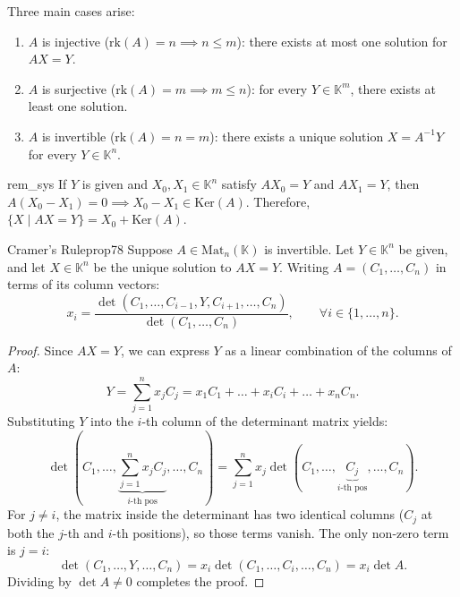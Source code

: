 \documentclass[11pt, a4paper]{article}
\newcommand{\K}{\mathbb{K}}
\begin{document}
Three main cases arise:
\begin{enumerate}
  \item $A$ is injective ($\text{rk}(A) = n \implies n \le m$): there exists at most one solution for $AX = Y$.
  \item $A$ is surjective ($\text{rk}(A) = m \implies m \le n$): for every $Y \in \K^m$, there exists at least one solution.
  \item $A$ is invertible ($\text{rk}(A) = n = m$): there exists a unique solution $X = A^{-1}Y$ for every $Y \in \K^n$.
\end{enumerate}

\begin{remark}{}{rem_sys}
  If $Y$ is given and $X_0, X_1 \in \K^n$ satisfy $A X_0 = Y$ and $A X_1 = Y$, then $A(X_0 - X_1) = 0 \implies X_0 - X_1 \in \text{Ker}(A)$.
  Therefore, $\{X \mid AX = Y\} = X_0 + \text{Ker}(A)$.
\end{remark}

\begin{proposition}{Cramer's Rule}{prop78}
  Suppose $A \in \text{Mat}_n(\K)$ is invertible. Let $Y \in \K^n$ be given, and let $X \in \K^n$ be the unique solution to $AX = Y$.
  Writing $A = (C_1, \dots, C_n)$ in terms of its column vectors:
  \[
    x_i = \frac{\det(C_1, \dots, C_{i-1}, Y, C_{i+1}, \dots, C_n)}{\det(C_1, \dots, C_n)}, \qquad \forall i \in \{1, \dots, n\}.
  \]
\end{proposition}

\begin{proof}
  Since $AX = Y$, we can express $Y$ as a linear combination of the columns of $A$:
  \[
    Y = \sum_{j=1}^n x_j C_j = x_1 C_1 + \dots + x_i C_i + \dots + x_n C_n.
  \]
  Substituting $Y$ into the $i$-th column of the determinant matrix yields:
  \[
    \det(C_1, \dots, \underbrace{\sum_{j=1}^n x_j C_j}_{i\text{-th pos}}, \dots, C_n) = \sum_{j=1}^n x_j \det(C_1, \dots, \underbrace{C_j}_{i\text{-th pos}}, \dots, C_n).
  \]
  For $j \neq i$, the matrix inside the determinant has two identical columns ($C_j$ at both the $j$-th and $i$-th positions), so those terms vanish. The only non-zero term is $j = i$:
  \[
    \det(C_1, \dots, Y, \dots, C_n) = x_i \det(C_1, \dots, C_i, \dots, C_n) = x_i \det A.
  \]
  Dividing by $\det A \neq 0$ completes the proof.
\end{proof}

\end{document}
